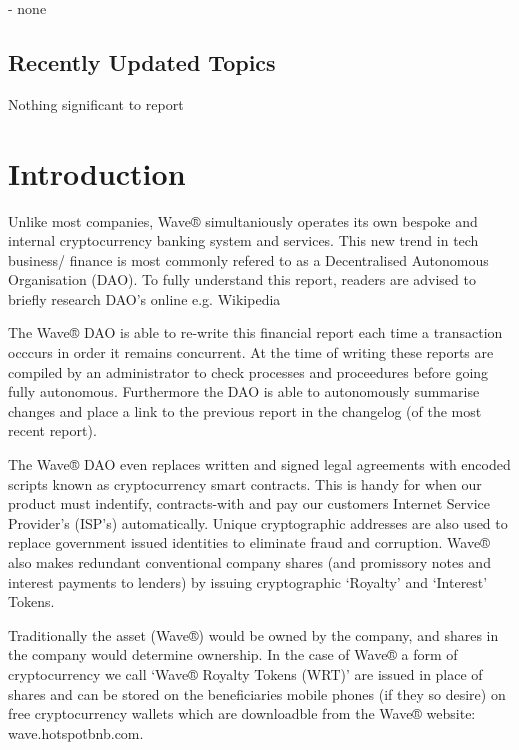 \documentclass[letterpaper,10pt,openany,oneside,english]{sphinxmanual}
\begin{document}
 - none


\section{Recently Updated Topics}
\label{\detokenize{releasenotes:recently-updated-topics}}
Nothing significant to report


\chapter{Introduction}
\label{\detokenize{introduction:introduction}}\label{\detokenize{introduction::doc}}
Unlike most companies, Wave® simultaniously operates its own bespoke and internal cryptocurrency banking system and services.
This new trend in tech business/ finance is most commonly refered to as a Decentralised Autonomous Organisation (DAO).
To fully understand this report, readers are advised to briefly research DAO’s online e.g. Wikipedia

\noindent{}

The Wave® DAO is able to re-write this financial report each time a transaction occcurs in order it remains concurrent.
At the time of writing these reports are compiled by an administrator to check processes and proceedures before going fully autonomous.
Furthermore the DAO is able to autonomously summarise changes and place a link to the previous report in the changelog (of the most recent report).

The Wave® DAO even replaces written and signed legal agreements with encoded scripts known as cryptocurrency smart contracts.
This is handy for when our product must indentify, contracts-with and pay our customers Internet Service Provider’s (ISP’s) automatically.
Unique cryptographic addresses are also used to replace government issued identities to eliminate fraud and corruption.
Wave® also makes redundant conventional company shares (and promissory notes and interest payments to lenders) by issuing cryptographic ‘Royalty’ and ‘Interest’ Tokens.

Traditionally the asset (Wave®) would be owned by the company, and shares in the company would determine ownership.
In the case of Wave® a form of cryptocurrency we call ‘Wave® Royalty Tokens (WRT)’ are issued in place of shares and can be stored on the beneficiaries mobile phones (if they so desire) on free cryptocurrency wallets which are downloadble from the Wave®  website: wave.hotspotbnb.com.
\end{document}
